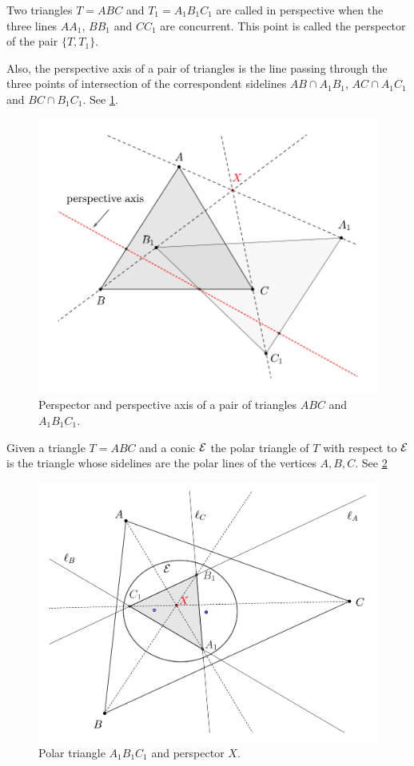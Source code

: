 

Two triangles $T=ABC$ and $T_1=A_1B_1C_1$ are called in perspective when  the three lines $AA_1$, $BB_1$ and $CC_1$ are concurrent. This point is called the perspector of the pair $\{T,T_1\}$.

Also, the perspective axis of a pair of triangles is the line passing through the   three points of intersection of the correspondent sidelines $AB\cap A_1B_1$,
$AC\cap A_1C_1$ and $BC\cap B_1C_1$.
See \cref{fig:appA-perspector}.
\begin{figure}
    \centering
    \includegraphics[scale=0.4]{zappA/pics/pics-appA-101-perspector.pdf}
    \caption{Perspector and perspective axis of a pair of triangles $ABC$ and $A_1B_1C_1$.}
    \label{fig:appA-perspector}
\end{figure}

Given a triangle $T=ABC$ and a conic $\mathcal{E}$ the polar triangle of $T$ with respect to $\mathcal{E}$ is the triangle whose sidelines are the polar lines of the vertices   $A,B,C$. See \cref{fig:appA-polar-triangle}
\begin{figure}
    \centering
    \includegraphics[scale=0.3]{zappA/pics/pics-appA-150-perspector-triangle-ellipse.pdf}
    \caption{Polar triangle $A_1B_1C_1$ and perspector $X$.}
    \label{fig:appA-polar-triangle}
\end{figure}

